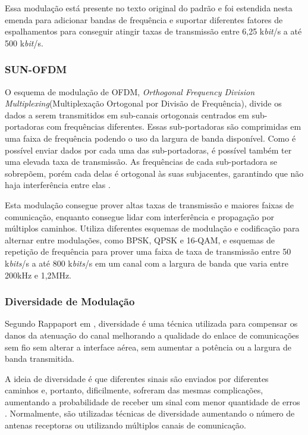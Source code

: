 Essa modulação está presente no texto original do padrão e foi estendida nesta emenda para adicionar bandas de frequência e suportar diferentes fatores de espalhamentos para conseguir atingir taxas de transmissão entre 6,25 k\emph{bit}/s a até 500 k\emph{bit}/s.

\subsubsection*{SUN-OFDM}
O esquema de modulação de OFDM, \emph{Orthogonal Frequency Division Multiplexing}(Multiplexação Ortogonal por Divisão de Frequência), divide os dados a serem transmitidos em sub-canais ortogonais centrados em  sub-portadoras com frequências diferentes. Essas sub-portadoras são comprimidas em uma faixa de frequência podendo o uso da largura de banda disponível. Como é possível enviar dados por cada uma das sub-portadoras, é possível também ter uma elevada taxa de transmissão. As frequências de cada sub-portadora se sobrepõem, porém cada delas é ortogonal às suas subjacentes, garantindo que não haja interferência entre elas \cite{rappaport2009}\cite{goldsmith2005wireless}.

Esta modulação consegue prover altas taxas de transmissão e maiores faixas de comunicação, enquanto consegue lidar com interferência e propagação por múltiplos caminhos. Utiliza diferentes esquemas de modulação e codificação para alternar entre modulações, como BPSK, QPSK e 16-QAM, e esquemas de repetição de frequência para prover uma faixa de taxa de transmissão entre 50 k\emph{bits}/s a até 800 k\emph{bits}/s em um canal com a largura de banda que varia entre 200kHz e 1,2MHz.

\subsubsection*{Diversidade de Modulação}
Segundo Rappaport em \cite{rappaport2009}, diversidade é uma técnica utilizada para compensar os danos da atenuação do canal melhorando a qualidade do enlace de comunicações sem fio sem alterar a interface aérea, sem aumentar a potência ou a largura de banda transmitida.

A ideia de diversidade é que diferentes sinais são enviados por diferentes caminhos e, portanto, dificilmente, sofreram das mesmas complicações, aumentando a probabilidade de receber um sinal com menor quantidade de erros \cite{goldsmith2005wireless}. Normalmente, são utilizadas técnicas de diversidade aumentando o número de antenas receptoras ou utilizando múltiplos canais de comunicação.

